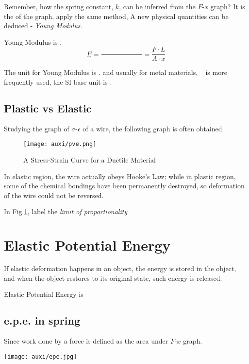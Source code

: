 \documentclass[a4paper]{tufte-handout}
\newenvironment{TaskBox} %
{\begin{tcolorbox}[breakable,colback=b1!30,colframe=b1,title=Task]} {\end{tcolorbox}}
\newenvironment{SummBox}
{\begin{tcolorbox}[breakable,colback=r1!30,colframe=r1,title=Summary]} {\end{tcolorbox}}
\begin{document}
Remember, how the spring constant, $k$, can be inferred from the $F$-$x$ graph? It is the \uline{\hspace{1 in}} of the graph, apply the same method, A new physical quantities can be deduced - \emph{Young Modulus}.

\begin{SummBox}
Young Modulus is \uline{\hfill{}}.
\[
  E=\frac{}{\hspace{1in}} = \frac{F\cdot L}{A\cdot x}
\]
\end{SummBox}
The unit for Young Modulus is \uline{\hspace{1in}}. and usually for metal materials, \si{\giga\Pascal} is more frequently used, the SI base unit is \uline{\hspace{1in}}. 

\subsection{Plastic vs Elastic}
Studying the graph of $\sigma$-$\epsilon$ of a wire, the following graph is often obtained.
\begin{figure}[h]
\centering
\texttt{[image: auxi/pve.png]}
\caption{A Stress-Strain Curve for a Ductile Material}
\label{fig:pve}
\end{figure}
In elastic region, the wire actually obeys Hooke's Law; while in plastic region, some of the chemical bondings have been permanently destroyed, so deformation of the wire could not be reversed.
\begin{TaskBox}
In Fig.\ref{fig:pve}, label the \emph{limit of proportionality}
\end{TaskBox}


\section{Elastic Potential Energy}
If elastic deformation happens in an object, the energy is stored in the object, and when the object restores to its original state, such energy is released.
\begin{SummBox}
Elastic Potential Energy is
\vspace{0.5in}
\end{SummBox}

\subsection{e.p.e. in spring}
Since work done by a force is defined as the area under $F$-$x$ graph.
\begin{marginfigure}[h]
\centering
\texttt{[image: auxi/epe.jpg]}
\end{marginfigure}
\end{document}
